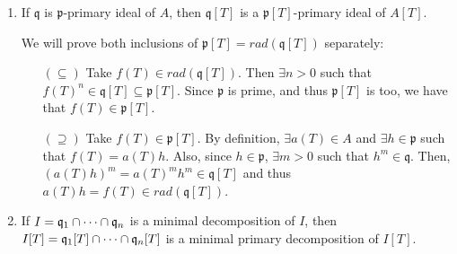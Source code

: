\begin{problem}
\begin{enumerate}[label=(\theproblem.\arabic*),ref=\theproblem.\arabic*]
\begin{sol}
\begin{proof}
                Now, let $\mathfrak{p}$ be a minimal prime of $I$.
                $\mathfrak{p}[T]$ must contain a minimal prime of $I[T]$, say, $\mathfrak{p}'[T]$
                Then, we take the contraction $I \subseteq \mathfrak{p}' \subseteq \mathfrak{p}$
                and by definition of $\mathfrak{p}$ being a minimal of $I$,
                we conclude that $\mathfrak{p}' = \mathfrak{p}$ and $\mathfrak{p}'[T] = \mathfrak{p}[T]$.
                Thus, $\mathfrak{p}[T]$ is a minimal prime of $I[T]$.

            \end{proof}
        \end{sol}

        \item If $\mathfrak{q}$ is $\mathfrak{p}$-primary ideal of $A$, then $\mathfrak{q}[T]$ is a $\mathfrak{p}[T]$-primary ideal of $A[T]$.
        \begin{sol}
            We will prove both inclusions of $\mathfrak{p}[T] = rad(\mathfrak{q}[T])$ separately:
            \begin{itemize}
                \item[$(\subseteq)$]
                Take $f(T) \in rad(\mathfrak{q}[T])$.
                Then $\exists n>0$ such that $f(T)^n \in \mathfrak{q}[T] \subseteq \mathfrak{p}[T]$.
                Since $\mathfrak{p}$ is prime, and thus $\mathfrak{p}[T]$ is too, we have that $f(T) \in \mathfrak{p}[T]$.
                \item[$(\supseteq)$]
                Take $f(T) \in \mathfrak{p}[T]$.
                By definition, $\exists a(T) \in A$ and $\exists h \in \mathfrak{p}$ such that $f(T) = a(T) h$.
                Also, since $h \in \mathfrak{p}$, $\exists m>0$ such that $h^m \in \mathfrak{q}$.
                Then, $( a(T) h )^m = a(T)^m h^m \in \mathfrak{q}[T]$ and thus $a(T) h = f(T) \in rad(\mathfrak{q}[T])$.
            \end{itemize}
        \end{sol}

        \item If $I = \mathfrak{q}_1 \cap \cdots \cap \mathfrak{q}_n$ is a minimal decomposition of $I$, then $I[T] = \mathfrak{q}_1[T] \cap \cdots \cap \mathfrak{q}_n[T]$ is a minimal primary decomposition of $I[T]$.
        \begin{sol}
        \end{sol}

    \end{enumerate}
\end{problem}